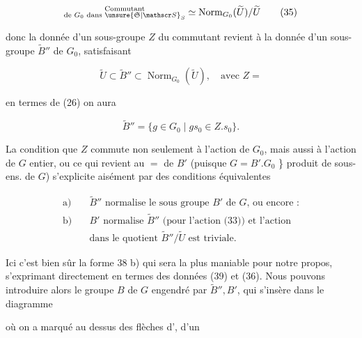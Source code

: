 
\[ \substack{\text{Commutant}\\\text{de }G_0\text{ dans }\unsure{\mathfrak S|\mathscr S}_S}\simeq\operatorname{Norm}_{G_0}(\widetilde U)/\widetilde U \tag*{(35)} \]

donc la donnée d'un sous-groupe $Z$ du commutant revient à la donnée d'un sous-groupe $\widetilde B''$ de $G_0$,  satisfaisant

\[ \widetilde U\subset\widetilde B''\subset\operatorname{Norm}_{G_0}(\widetilde U),\quad\text{avec }Z= \tag*{(36)} \]


en termes de (26) on aura

\[ \widetilde B''=\{g\in G_0\mid gs_0\in Z.s_0\}.\tag*{(37)} \]

La condition que $Z$ commute non seulement à l'action de $G_0$, mais aussi à l'action de $G$  entier, ou ce qui revient au $=$ de $B'$ (puisque $G=B'.G_0$ \} produit de sous-ens. de $G$) s'explicite aisément par  des conditions équivalentes

\[
\begin{aligned}
\text{a)}\quad&\widetilde B''\text{ normalise le sous groupe $B'$ de $G$, ou encore :}\\
\text{b)}\quad&B'\text{ normalise $\widetilde B''$ (pour l'action (33)) et l'action}\\
&\text{dans le quotient $\widetilde B''/\widetilde U$ est triviale.}
\end{aligned}\tag*{(38)}
\]

Ici c'est bien sûr la forme 38 b) qui sera la plus maniable pour notre propos,  s'exprimant directement en termes des données (39) et (36). Nous pouvons introduire alors le groupe $B$ de $G$ engendré par $\widetilde B'',B'$, qui s'insère dans le diagramme


où on a marqué au dessus des flèches d', d'un

